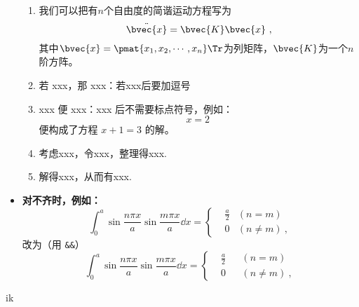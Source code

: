 \begin{itemize}
\begin{enumerate}
\item 
我们可以把有$n$个自由度的简谐运动方程写为
\begin{equation}
\ddot{\bvec{x}} = \bvec{K}\bvec{x}~,
\end{equation}
其中$\bvec{x}=\pmat{x_1, x_2, \cdots, x_n}\Tr$为列矩阵，$\bvec{K}$为一个$n$阶方阵。

\item 若 xxx，那 xxx：若xxx后要加逗号
\item xxx 便 xxx：xxx 后不需要标点符号，例如：
\begin{equation}
x=2~
\end{equation}
便构成了方程 $x+1=3$ 的解。
\item 考虑xxx，令xxx，整理得xxx.
\item 解得xxx，从而有xxx.
\end{enumerate}
\item \textbf{对不齐时，例如：}
\begin{equation}
\int_0^a\sin\frac{n\pi x}{a}\sin\frac{m\pi x}{a}\dd x=\left\{\begin{aligned}
&\frac{a}{2}&(n=m)\\
& 0     &(n\neq m)~,
\end{aligned}\right.
\end{equation}
改为（用 \verb|&&|）
\begin{equation}
\int_0^a\sin\frac{n\pi x}{a}\sin\frac{m\pi x}{a}\dd x=\left\{\begin{aligned}
&\frac{a}{2}&&(n=m)\\
& 0     &&(n\neq m)~,
\end{aligned}\right.
\end{equation}
\end{itemize}
ik